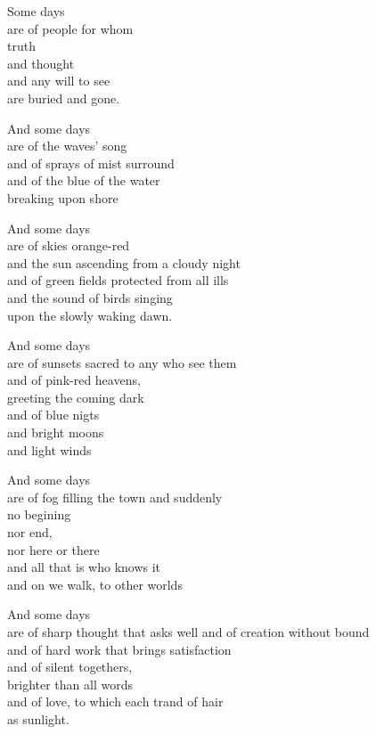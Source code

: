 \documentclass{article}
\begin{document}
        Some days \\
        are of people for whom \\
        truth \\
        and thought \\
        and any will to see \\
        are buried and gone.

        \bigskip

        And some days \\
        are of the waves' song \\
        and of sprays of mist surround \\
        and of the blue of the water \\
        breaking upon shore

        And some days \\
        are of skies  orange-red \\
        and the sun ascending from a cloudy night \\
        and of green fields protected from all ills \\
        and the sound of birds singing \\
        upon the slowly waking dawn.

        And some days \\
        are of sunsets sacred to any who see them \\
        and of pink-red heavens, \\
        greeting the coming dark \\
        and of blue nigts \\
        and bright moons \\
        and light winds

        And some days \\
        are of fog  filling the town
        and suddenly \\
        no begining \\
        nor end, \\
        nor here or there \\
        and all that is who knows it \\
        and on we walk, to other worlds

        And some days \\
        are of sharp thought that asks well
        and of creation without bound \\
        and of hard work that brings satisfaction \\
        and of silent togethers, \\
        brighter than all words \\
        and of love, to which each trand of hair \\
        as sunlight. \\
\end{document}
